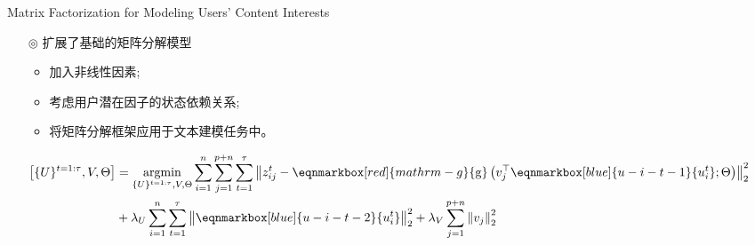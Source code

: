 \documentclass{beamer}
\begin{document}
\begin{frame}[allowframebreaks]{Matrix Factorization for Modeling Users' Content Interests}
\begin{itemize}
		\item[$\circledcirc$] 扩展了基础的矩阵分解模型
		      \begin{itemize}
			      \item 加入非线性因素;
			      \item 考虑用户潜在因子的状态依赖关系;
			      \item 将矩阵分解框架应用于文本建模任务中。
		      \end{itemize}
	\end{itemize}
	\begin{align*}
		\begin{aligned}
			{\left[\{U\}^{t=1: \tau}, V, \Theta\right] } & =\underset{\{U\}^{t=1: \tau}, V, \Theta}{\operatorname{argmin}} \sum_{i=1}^n \sum_{j=1}^{p+n} \sum_{t=1}^\tau\left\|z_{i j}^t-\eqnmarkbox[red]{mathrm-g}{\mathrm{g}}\left(v_j^{\top} \eqnmarkbox[blue]{u-i-t-1}{u_i^t} ; \Theta\right)\right\|_2^2 \\
			& +\lambda_U \sum_{i=1}^n \sum_{t=1}^\tau\left\|\eqnmarkbox[blue]{u-i-t-2}{u_i^t}\right\|_2^2+\lambda_V \sum_{j=1}^{p+n}\left\|v_j\right\|_2^2
		\end{aligned}
	\end{align*}

\end{frame}
\end{document}
